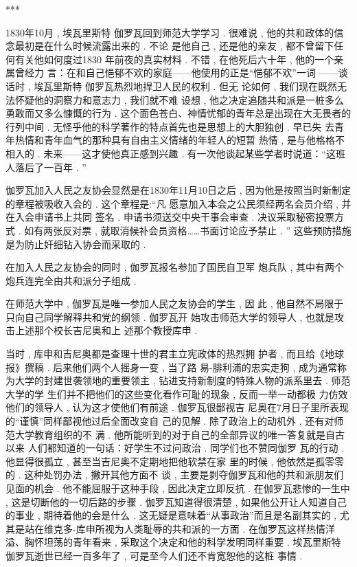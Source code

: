 \begin{center}***
\end{center}

1830年10月 , 埃瓦里斯特 \textbullet 伽罗瓦回到师范大学学习 . 很难说 , 他的共和政体的信念最初是在什么时候流露出来的 . 不论 是他自己 , 还是他的亲友 , 都不曾留下任何有关他如何度过1830 年前夜的真实材料 . 不错 , 在他死后六十年 , 他的一个亲属曾经力 言：在和自己悒郁不欢的家庭——他使用的正是“悒郁不欢”一词 ——谈话时 , 埃瓦里斯特 \textbullet 伽罗瓦热烈地捍卫人民的权利 . 但无 论如何 , 我们现在既然无法怀疑他的洞察力和意志力 , 我们就不难 设想 , 他之决定追随共和派是一桩多么勇敢而又多么慷慨的行为 .  这个面色苍白、神情忧郁的青年总是出现在大无畏者的行列中间 .  无怪乎他的科学著作的特点首先也是思想上的大胆独创 . 早已失 去青年热情和青年血气的那种具有自由主义情绪的年轻人的短暂 热情 , 是与他格格不相入的 . 未来——这才使他真正感到兴趣 .  有一次他谈起某些学者时说道：“这班人落后了一百年 . ”

伽罗瓦加入人民之友协会显然是在1830年11月10日之后 ,  因为他是按照当时新制定的章程被吸收入会的 . 这个章程是:“凡 愿意加入本会之公民须经两名会员介绍 , 并在入会申请书上共同 签名 . 申请书须送交中央干事会审查 . 决议采取秘密投票方式 .  如有两张反对票 , 就取消候补会员资格……书面讨论应予禁止 . ” 这些预防措施是为防止奸细钻入协会而采取的 . 

在加入人民之友协会的同时 , 伽罗瓦报名参加了国民自卫军 炮兵队 , 其中有两个炮兵连完全由共和派分子组成 . 

在师范大学中 , 伽罗瓦是唯一参加人民之友协会的学生 , 因 此 , 他自然不局限于只向自己同学解释共和党的纲领 . 伽罗瓦开 始攻击师范大学的领导人 , 也就是攻击上述那个校长吉尼奥和上 述那个教授库申 . 

当时 , 库申和吉尼奥都是查理十世的君主立宪政体的热烈拥 护者 , 而且给《地球报》撰稿 . 后来他们两个人摇身一变 , 当了路 易-腓利浦的忠实走狗 , 成为通常称为大学的封建世袭领地的重要领主 , 钻进支持新制度的特殊人物的派系里去 . 师范大学的学 生们并不把他们的这些变化看作可耻的现象 , 反而一举一动都极 力仿效他们的领导人 , 认为这才使他们有前途 . 伽罗瓦很鄙视吉 尼奥在7月日子里所表现的“谨慎”同样鄙视他过后全面改变自 己的见解 . 除了政治上的动机外 , 还有对师范大学教育组织的不 满 . 他所能听到的对于自己的全部异议的唯一答复就是自古以来 人们都知道的一句话：好学生不过问政治 . 同学们也不赞同伽罗 瓦的行动 . 他显得很孤立 , 甚至当吉尼奥不定期地把他软禁在家
里的时候 , 他依然是孤零零的 . 这种处罚办法 , 撇开其他方面不 谈 , 主要是剥夺伽罗瓦和他的共和派朋友们见面的机会 . 他不能屈服于这种手段 , 因此决定立即反抗 . 在伽罗瓦悲惨的一生中 , 这是切断他的一切后路的步骤 . 伽罗瓦知道得很清楚 , 如果他公开让人知道自己的事业 , 期待着他的会是什么 . 这无疑是意味着“从事政治”而且是名副其实的 , 尤其是站在维克多-库申所视为人类耻辱的共和派的一方面 . 在伽罗瓦这样热情洋溢、胸怀坦荡的青年看来 , 采取这个决定和他的科学发明同样重要 . 埃瓦里斯特 \textbullet 伽罗瓦逝世已经一百多年了 , 可是至今人们还不肯宽恕他的这桩 事情 . 

